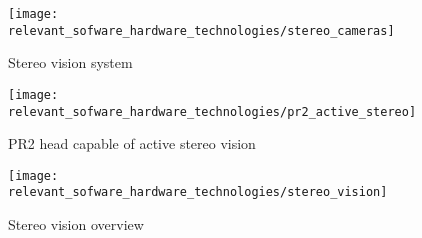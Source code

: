 \begin{figure}[H]
	\centering
	\texttt{[image: relevant\_sofware\_hardware\_technologies/stereo\_cameras]}
	\caption[Stereo vision system]{Stereo vision system \cite{Kaczurba2013}}
	\label{fig:relevant-sofware-hardware-technologies_stereo-cameras}
\end{figure}


\begin{figure}[H]
	\centering
	\texttt{[image: relevant\_sofware\_hardware\_technologies/pr2\_active\_stereo]}
	\caption[PR2 head capable of active stereo vision]{PR2 head capable of active stereo vision\protect\footnotemark}
	\label{fig:relevant-sofware-hardware-technologies_pr2-active-stereo}
\end{figure}


\begin{figure}[hb]
	\centering
	\texttt{[image: relevant\_sofware\_hardware\_technologies/stereo\_vision]}
	\caption[Stereo vision overview]{Stereo vision overview \cite{Yang2014}}
	\label{fig:relevant-sofware-hardware-technologies_stereo-vision}
\end{figure}

